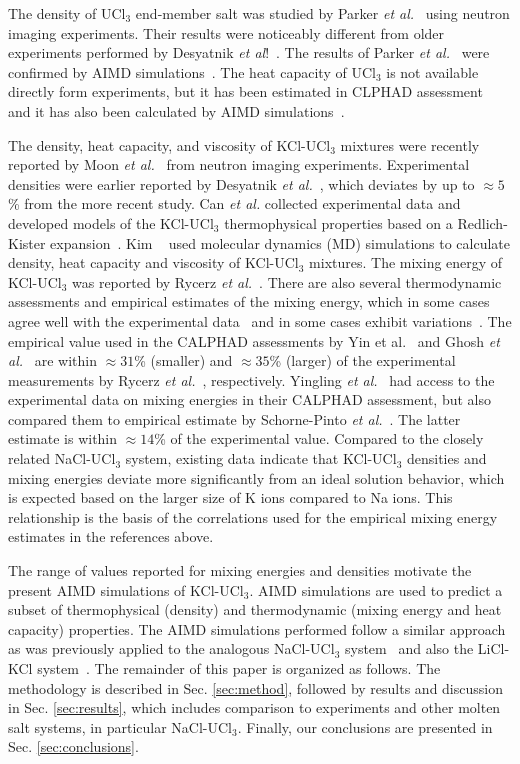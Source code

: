\documentclass[preprint,3p,10pt,twocolumn,number,sort&compress]{elsarticle}
\begin{document}
The density of UCl$_3$ end-member salt was studied by Parker \textit{et al.}~\cite{Parker} using neutron imaging experiments. Their results were noticeably different from older experiments performed by Desyatnik \textit{et al}!~\cite{Desyatnik2}. The results of Parker \textit{et al.}~\cite{Parker} were confirmed by AIMD simulations~\cite{Andersson}. The heat capacity of UCl$_3$ is not available directly form experiments, but it has been estimated in CLPHAD assessment~\cite{YIN2020,BENES2008}
 and it has also been calculated by AIMD simulations~\cite{Andersson}.
 
The density, heat capacity, and viscosity of KCl-UCl$_3$ mixtures were recently reported by Moon \textit{et al.}~\cite{Moon} from neutron imaging experiments. Experimental densities were earlier reported by Desyatnik \textit{et al.}~\cite{DesyatnikKCl}, which deviates by up to $\approx 5$\% from the more recent study. 
Can \textit{et al.} collected experimental data and developed models of the KCl-UCl$_3$ thermophysical properties based on a Redlich-Kister expansion~\cite{agca2022}. Kim ~\cite{Kim} used molecular dynamics (MD) simulations to calculate density, heat capacity and viscosity of KCl-UCl$_3$ mixtures. 
The mixing energy of KCl-UCl$_3$ was reported by Rycerz \textit{et al.}~\cite{Rycerz}. 
There are also several thermodynamic assessments and empirical estimates of the mixing energy, which in some cases agree well with the experimental data~\cite{Rycerz,Yingling} and in some cases exhibit variations~\cite{YIN2020,Ghosh}.
The empirical value used in the CALPHAD assessments by Yin et al.~\cite{YIN2020} and Ghosh \textit{et al.}~\cite{Ghosh} are within $\approx 31$\% (smaller) and $\approx 35$\% (larger) of the experimental measurements by Rycerz \textit{et al.}~\cite{Rycerz}, respectively. Yingling \textit{et al.}~\cite{Yingling} had access to the experimental data on mixing energies in their CALPHAD assessment, but also compared them to empirical estimate by Schorne-Pinto \textit{et al.}~\cite{Pinto}. The latter estimate is within $\approx 14$\% of the experimental value.
Compared to the closely related NaCl-UCl$_3$ system, existing data indicate that KCl-UCl$_3$ densities and mixing energies deviate more significantly from an ideal solution behavior, which is expected based on the larger size of K ions compared to Na ions. This relationship is the basis of the correlations used for the empirical mixing energy estimates in the references above. 

The range of values reported for mixing energies and densities motivate the present AIMD simulations of KCl-UCl$_3$. 
AIMD simulations are used to predict a subset of thermophysical (density) and thermodynamic (mixing energy and heat capacity) properties.
 The AIMD simulations performed 
 follow a similar approach as was previously applied to the analogous NaCl-UCl$_3$ system~\cite{Andersson} and also the LiCl-KCl system~\cite{DUEMMLER2022153414}.  
The remainder of this paper is organized as follows. The methodology is described in Sec. \ref{sec:method}, followed by results and discussion in Sec. \ref{sec:results}, which includes comparison to experiments and other molten salt systems, in particular NaCl-UCl$_3$.  
Finally, our conclusions are presented in Sec. \ref{sec:conclusions}. 
\end{document}
